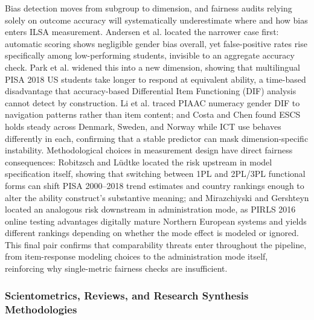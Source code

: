 \documentclass{ieeeaccess}
\begin{document}
Bias detection moves from subgroup to dimension, and fairness audits relying solely on outcome accuracy will systematically underestimate where and how bias enters ILSA measurement. Andersen et al. \cite{andersen-etal2025} located the narrower case first: automatic scoring shows negligible gender bias overall, yet false-positive rates rise specifically among low-performing students, invisible to an aggregate accuracy check. Park et al. \cite{park-etal2025} widened this into a new dimension, showing that multilingual PISA 2018 US students take longer to respond at equivalent ability, a time-based disadvantage that accuracy-based Differential Item Functioning (DIF) analysis cannot detect by construction. Li et al. \cite{li-etal2025} traced PIAAC numeracy gender DIF to navigation patterns rather than item content; and Costa and Chen \cite{costa-chen2023} found ESCS holds steady across Denmark, Sweden, and Norway while ICT use behaves differently in each, confirming that a stable predictor can mask dimension-specific instability. Methodological choices in measurement design have direct fairness consequences: Robitzsch and L\"{u}dtke \cite{robitzsch-ludtke2022} located the risk upstream in model specification itself, showing that switching between 1PL and 2PL/3PL functional forms can shift PISA 2000--2018 trend estimates and country rankings enough to alter the ability construct's substantive meaning; and Mirazchiyski and Gershteyn \cite{mirazchiyski-gershteyn2024} located an analogous risk downstream in administration mode, as PIRLS 2016 online testing advantages digitally mature Northern European systems and yields different rankings depending on whether the mode effect is modeled or ignored. This final pair confirms that comparability threats enter throughout the pipeline, from item-response modeling choices to the administration mode itself, reinforcing why single-metric fairness checks are insufficient.

\subsubsection{Scientometrics, Reviews, and Research Synthesis Methodologies}\label{subsubsec4.5.3}
\end{document}
